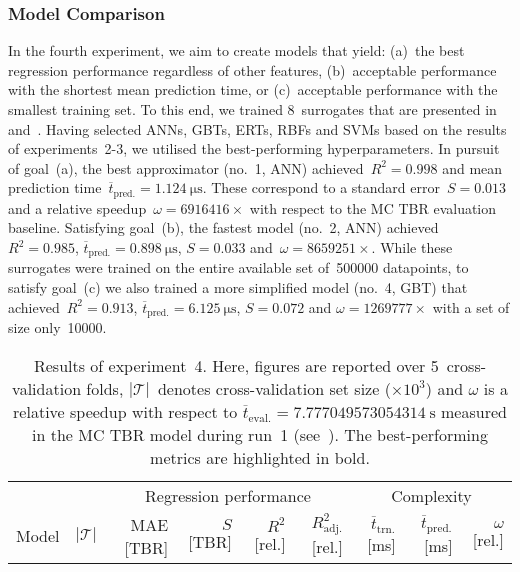 \subsubsection{Model Comparison}
In the fourth experiment, we aim to create models that yield:
(a)~the best regression performance regardless
of other features, (b)~acceptable performance with the shortest mean
prediction time, or (c)~acceptable performance with the smallest training set.
To this end, we trained 8~surrogates that are presented in~
and~.
Having selected ANNs, GBTs, ERTs, RBFs and SVMs based on the results of
experiments~2-3, we utilised the best-performing hyperparameters.
In pursuit of goal~(a), the best approximator (no.~1,
ANN) achieved~$R^2=\num{0.998}$ and mean prediction
time~$\overline{t}_{\text{pred.}}=\SI{1.124}{\micro\second}$. These correspond
to a standard error~$S=\num{0.013}$ and a relative speedup~$\omega=\num{6916416} \times$
with respect to the MC TBR evaluation baseline. Satisfying
goal~(b), the fastest model (no.~2, ANN) achieved~$R^2=\num{0.985}$,
$\overline{t}_{\text{pred.}}=\SI{0.898}{\micro\second}$, $S=\num{0.033}$
and~$\omega=\num{8659251} \times$.
While these surrogates
were trained on the entire available set of~\num{500000} datapoints, to satisfy
goal~(c) we also trained a more simplified model (no.~4, GBT)
that achieved~$R^2=\num{0.913}$,
$\overline{t}_{\text{pred.}}=\SI{6.125}{\micro\second}$, $S=\num{0.072}$ and $\omega=\num{1269777} \times$
with a set of size only~\num{10000}.

\begin{table*}
	\centering
	\caption{\label{tbl:exp4-detailed-results}Results of experiment~4. Here, figures are reported over 5~cross-validation folds,
		$|\mathcal{T}|$~denotes cross-validation set size ($\times 10^3$)
		and $\omega$ is a relative speedup with respect to
		$\overline{t}_{\text{eval.}}=\SI{7.777049573054314}{\second}$
		measured in the MC TBR model during run~1 (see~).
		The best-performing metrics are highlighted in bold.}
	\setlength\tabcolsep{4pt}
	\begin{indented}
	\item[]
		\scriptsize
		\begin{tabular}{lrrrrrrrr}
		\toprule
		{} & {} & \multicolumn{4}{c}{Regression performance} &
		\multicolumn{3}{c}{Complexity}\\
		\cmidrule(lr){3-6}
		\cmidrule(lr){7-9}
		Model & $|\mathcal{T}|$ & MAE [TBR] & $S$ [TBR] & $R^2$ [rel.] & $R^2_{\text{adj.}}$ [rel.]
						& $\overline{t}_{\text{trn.}}$ [\si{\milli\second}] &
		$\overline{t}_{\text{pred.}}$ [\si{\milli\second}] & $\omega$ [rel.]\\
		\midrule
		
		\bottomrule
		\end{tabular}
	\end{indented}
\end{table*}

